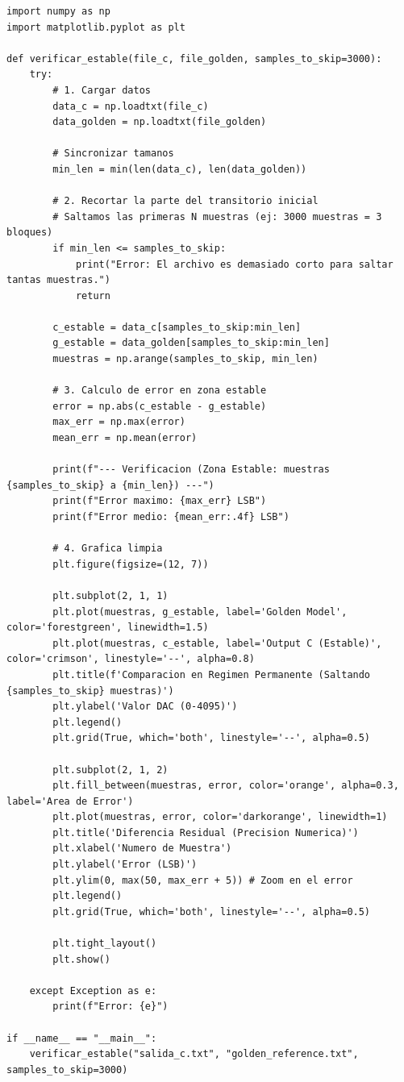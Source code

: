 \vspace{0.5cm}
\begin{lstlisting}[style=mystyle, caption={Código empleado para comparar golden y salida de código en C.}, label={lst:filtro + ds}]
import numpy as np
import matplotlib.pyplot as plt

def verificar_estable(file_c, file_golden, samples_to_skip=3000):
    try:
        # 1. Cargar datos
        data_c = np.loadtxt(file_c)
        data_golden = np.loadtxt(file_golden)
        
        # Sincronizar tamanos
        min_len = min(len(data_c), len(data_golden))
        
        # 2. Recortar la parte del transitorio inicial
        # Saltamos las primeras N muestras (ej: 3000 muestras = 3 bloques)
        if min_len <= samples_to_skip:
            print("Error: El archivo es demasiado corto para saltar tantas muestras.")
            return

        c_estable = data_c[samples_to_skip:min_len]
        g_estable = data_golden[samples_to_skip:min_len]
        muestras = np.arange(samples_to_skip, min_len)

        # 3. Calculo de error en zona estable
        error = np.abs(c_estable - g_estable)
        max_err = np.max(error)
        mean_err = np.mean(error)

        print(f"--- Verificacion (Zona Estable: muestras {samples_to_skip} a {min_len}) ---")
        print(f"Error maximo: {max_err} LSB")
        print(f"Error medio: {mean_err:.4f} LSB")

        # 4. Grafica limpia
        plt.figure(figsize=(12, 7))

        plt.subplot(2, 1, 1)
        plt.plot(muestras, g_estable, label='Golden Model', color='forestgreen', linewidth=1.5)
        plt.plot(muestras, c_estable, label='Output C (Estable)', color='crimson', linestyle='--', alpha=0.8)
        plt.title(f'Comparacion en Regimen Permanente (Saltando {samples_to_skip} muestras)')
        plt.ylabel('Valor DAC (0-4095)')
        plt.legend()
        plt.grid(True, which='both', linestyle='--', alpha=0.5)

        plt.subplot(2, 1, 2)
        plt.fill_between(muestras, error, color='orange', alpha=0.3, label='Area de Error')
        plt.plot(muestras, error, color='darkorange', linewidth=1)
        plt.title('Diferencia Residual (Precision Numerica)')
        plt.xlabel('Numero de Muestra')
        plt.ylabel('Error (LSB)')
        plt.ylim(0, max(50, max_err + 5)) # Zoom en el error
        plt.legend()
        plt.grid(True, which='both', linestyle='--', alpha=0.5)

        plt.tight_layout()
        plt.show()

    except Exception as e:
        print(f"Error: {e}")

if __name__ == "__main__":
    verificar_estable("salida_c.txt", "golden_reference.txt", samples_to_skip=3000)
\end{lstlisting}

